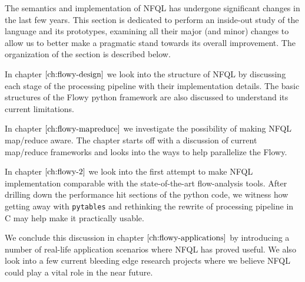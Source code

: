 The semantics and implementation of \ac{NFQL} has undergone significant
changes in the last few years. This section is dedicated to perform an
inside-out study of the language and its prototypes, examining all their major
(and minor) changes to allow us to better make a pragmatic stand towards its
overall improvement. The organization of the section is described below.

\vspace{50pt}

In chapter $\ref{ch:flowy-design}$ we look into the structure of \ac{NFQL} by
discussing each stage of the processing pipeline with their implementation
details. The basic structures of the Flowy python framework are also discussed
to understand its current limitations.

In chapter $\ref{ch:flowy-mapreduce}$ we investigate the possibility of making
\ac{NFQL} map/reduce aware. The chapter starts off with a discussion of
current map/reduce frameworks and looks into the ways to help parallelize the
Flowy.

In chapter $\ref{ch:flowy-2}$ we look into the first attempt to make \ac{NFQL}
implementation comparable with the state-of-the-art flow-analysis tools. After
drilling down the performance hit sections of the python code, we witness how
getting away with \texttt{pytables} and rethinking the rewrite of processing
pipeline in C may help make it practically usable.

We conclude this discussion in chapter $\ref{ch:flowy-applications}$ by
introducing a number of real-life application scenarios where \ac{NFQL} has
proved useful. We also look into a few current bleeding edge research
projects where we believe \ac{NFQL} could play a vital role in the near
future.
